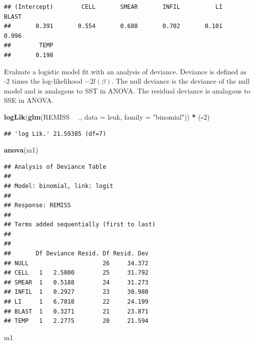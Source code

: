 \documentclass[
]{book}
\newenvironment{Shaded}{\begin{snugshade}}{\end{snugshade}}
\newcommand{\DataTypeTok}[1]{\textcolor[rgb]{0.13,0.29,0.53}{#1}}
\newcommand{\DecValTok}[1]{\textcolor[rgb]{0.00,0.00,0.81}{#1}}
\newcommand{\KeywordTok}[1]{\textcolor[rgb]{0.13,0.29,0.53}{\textbf{#1}}}
\newcommand{\NormalTok}[1]{#1}
\newcommand{\OperatorTok}[1]{\textcolor[rgb]{0.81,0.36,0.00}{\textbf{#1}}}
\newcommand{\StringTok}[1]{\textcolor[rgb]{0.31,0.60,0.02}{#1}}
\begin{document}
\begin{verbatim}
## (Intercept)        CELL       SMEAR       INFIL          LI       BLAST 
##       0.391       0.554       0.688       0.702       0.101       0.996 
##        TEMP 
##       0.198
\end{verbatim}

Evaluate a logistic model fit with an analysis of deviance. Deviance is defined as -2 times the log-likelihood \(-2l(\beta)\). The null deviance is the deviance of the null model and is analagous to SST in ANOVA. The residual deviance is analagous to SSE in ANOVA.

\begin{Shaded}
\begin{Highlighting}[]
\KeywordTok{logLik}\NormalTok{(}\KeywordTok{glm}\NormalTok{(REMISS }\OperatorTok{~}\StringTok{ }\NormalTok{., }\DataTypeTok{data =}\NormalTok{ leuk, }\DataTypeTok{family =} \StringTok{"binomial"}\NormalTok{)) }\OperatorTok{*}\StringTok{ }\NormalTok{(}\OperatorTok{-}\DecValTok{2}\NormalTok{)}
\end{Highlighting}
\end{Shaded}

\begin{verbatim}
## 'log Lik.' 21.59385 (df=7)
\end{verbatim}

\begin{Shaded}
\begin{Highlighting}[]
\KeywordTok{anova}\NormalTok{(m1)}
\end{Highlighting}
\end{Shaded}

\begin{verbatim}
## Analysis of Deviance Table
## 
## Model: binomial, link: logit
## 
## Response: REMISS
## 
## Terms added sequentially (first to last)
## 
## 
##       Df Deviance Resid. Df Resid. Dev
## NULL                     26     34.372
## CELL   1   2.5800        25     31.792
## SMEAR  1   0.5188        24     31.273
## INFIL  1   0.2927        23     30.980
## LI     1   6.7818        22     24.199
## BLAST  1   0.3271        21     23.871
## TEMP   1   2.2775        20     21.594
\end{verbatim}

\begin{Shaded}
\begin{Highlighting}[]
\NormalTok{m1}
\end{Highlighting}
\end{Shaded}
\end{document}
